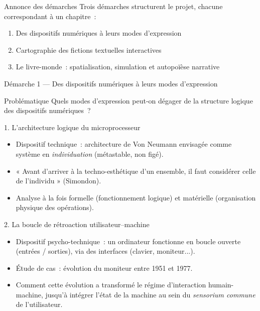 \documentclass[xcolor=monochrome,11pt]{beamer}
\begin{document}
\begin{frame}{Annonce des démarches}
  Trois démarches structurent le projet, chacune correspondant à un
  chapitre~:
  \begin{enumerate}
    \item Des dispositifs numériques à leurs modes d'expression
    \item Cartographie des fictions textuelles interactives
    \item Le livre-monde~: spatialisation, simulation et autopoïèse
      narrative
  \end{enumerate}
\end{frame}

\begin{frame}{Démarche 1 --- Des dispositifs numériques à leurs modes d'expression}
  \begin{block}{Problématique}
    \small Quels modes d'expression peut-on dégager de la structure
    logique des dispositifs numériques~?
  \end{block}
\end{frame}

\begin{frame}{1. L'architecture logique du microprocesseur}
  \footnotesize
  \begin{itemize}
    \item Dispositif technique~: architecture de Von Neumann envisagée
      comme système en \emph{individuation} (métastable, non figé).
    \item « Avant d'arriver à la techno-esthétique d'un ensemble, il faut
      considérer celle de l'individu » (Simondon).
    \item Analyse à la fois formelle (fonctionnement logique) et
      matérielle (organisation physique des opérations).
  \end{itemize}
\end{frame}

\begin{frame}{2. La boucle de rétroaction utilisateur--machine}
  \footnotesize
  \begin{itemize}
    \item Dispositif psycho-technique~: un ordinateur fonctionne en boucle
      ouverte (entrées / sorties), via des interfaces (clavier,
      moniteur...).
    \item Étude de cas~: évolution du moniteur entre 1951 et 1977.
    \item Comment cette évolution a transformé le régime d'interaction
      humain-machine, jusqu'à intégrer l'état de la machine au sein du
      \emph{sensorium commune} de l'utilisateur.
  \end{itemize}
\end{frame}
\end{document}
